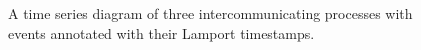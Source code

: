 \documentclass{article}
\begin{document}
\begin{enumerate}
\begin{figure}
\begin{tikzpicture}
            \end{tikzpicture}

            \caption{
                A time series diagram of three intercommunicating processes
                with events annotated with their Lamport timestamps.
            }
        \end{figure}
\end{enumerate}
\end{document}
